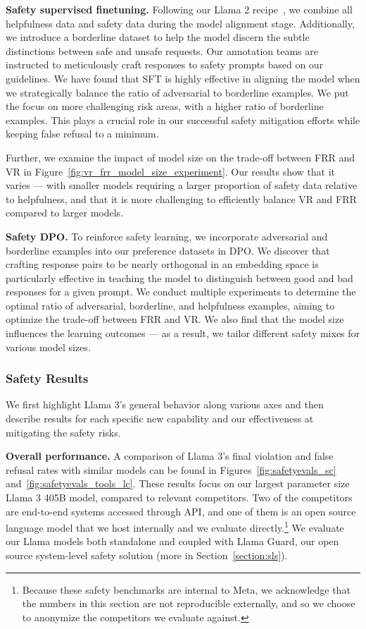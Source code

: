 \textbf{Safety supervised finetuning.} Following our Llama 2 recipe~\citep{touvron2023llama2}, we combine all helpfulness data and safety data during the model alignment stage. Additionally, we introduce a borderline dataset to help the model discern the subtle distinctions between safe and unsafe requests. Our annotation teams are instructed to meticulously craft responses to safety prompts based on our guidelines. We have found that SFT is highly effective in aligning the model when we strategically balance the ratio of adversarial to borderline examples. We put the focus on more challenging risk areas, with a higher ratio of borderline examples. This plays a crucial role in our successful safety mitigation efforts while keeping false refusal to a minimum.

Further, we examine the impact of model size on the trade-off between FRR and VR in Figure~\ref{fig:vr_frr_model_size_experiment}. Our results show that it varies --- with smaller models requiring a larger proportion of safety data relative to helpfulness, and that it is more challenging to efficiently balance VR and FRR compared to larger models.

\textbf{Safety DPO.} To reinforce safety learning, we incorporate adversarial and borderline examples into our preference datasets in DPO. We discover that crafting response pairs to be nearly orthogonal in an embedding space is particularly effective in teaching the model to distinguish between good and bad responses for a given prompt. We conduct multiple experiments to determine the optimal ratio of adversarial, borderline, and helpfulness examples, aiming to optimize the trade-off between FRR and VR. We also find that the model size influences the learning outcomes --- as a result, we tailor different safety mixes for various model sizes.

\subsubsection{Safety Results}

We first highlight Llama 3's general behavior along various axes and then describe results for each specific new capability and our effectiveness at mitigating the safety risks.

\textbf{Overall performance.} A comparison of Llama 3's final violation and false refusal rates with similar models can be found in Figures~\ref{fig:safetyevals_sc} and~\ref{fig:safetyevals_tools_lc}.  These results focus on our largest parameter size Llama 3 405B model, compared to relevant competitors. Two of the competitors are end-to-end systems accessed through API, and one of them is an open source language model that we host internally and we evaluate directly.\footnote{Because these safety benchmarks are internal to Meta, we acknowledge that the numbers in this section are not reproducible externally, and so we choose to anonymize the competitors we evaluate against.} We evaluate our Llama models both standalone and coupled with Llama Guard, our open source system-level safety solution (more in Section~\ref{section:sls}).  

